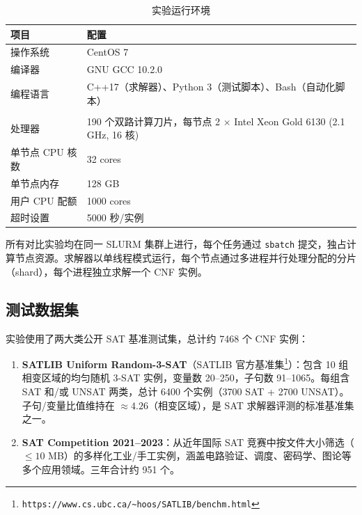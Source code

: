 \documentclass[12pt,a4paper]{article}
\begin{document}
\begin{table}[H]
\centering
\renewcommand{\arraystretch}{1.5}
\begin{tabular}{ll}
\toprule
\textbf{项目} & \textbf{配置} \\
\midrule
操作系统       & CentOS 7 \\
编译器         & GNU GCC 10.2.0 \\
编程语言       & C++17（求解器）、Python 3（测试脚本）、Bash（自动化脚本） \\
\addlinespace
\multicolumn{2}{c}{\textbf{集群环境（SLURM 调度）}} \\
处理器         & 190 个双路计算刀片，每节点 2 $\times$ Intel Xeon Gold 6130 (2.1 GHz, 16 核) \\
单节点 CPU 核数 & 32 cores \\
单节点内存     & 128 GB \\
用户 CPU 配额  & 1000 cores \\
超时设置       & 5000 秒/实例 \\
\bottomrule
\end{tabular}
\caption{实验运行环境}
\label{tab:env}
\end{table}

所有对比实验均在同一 SLURM 集群上进行，每个任务通过 \texttt{sbatch} 提交，独占计算节点资源。求解器以单线程模式运行，每个节点通过多进程并行处理分配的分片（shard），每个进程独立求解一个 CNF 实例。

\subsection{测试数据集}

实验使用了两大类公开 SAT 基准测试集，总计约 7468 个 CNF 实例：

\begin{enumerate}[label=(\arabic*)]
    \item \textbf{SATLIB Uniform Random-3-SAT}（SATLIB 官方基准集\footnote{\texttt{https://www.cs.ubc.ca/\textasciitilde hoos/SATLIB/benchm.html}}）：包含 10 组相变区域的均匀随机 3-SAT 实例，变量数 20--250，子句数 91--1065。每组含 SAT 和/或 UNSAT 两类，总计 6400 个实例（3700 SAT + 2700 UNSAT）。子句/变量比值维持在 $\approx 4.26$（相变区域），是 SAT 求解器评测的标准基准集之一。
    \item \textbf{SAT Competition 2021--2023}：从近年国际 SAT 竞赛中按文件大小筛选（$\leq 10$ MB）的多样化工业/手工实例，涵盖电路验证、调度、密码学、图论等多个应用领域。三年合计约 951 个。
\end{enumerate}
\end{document}

